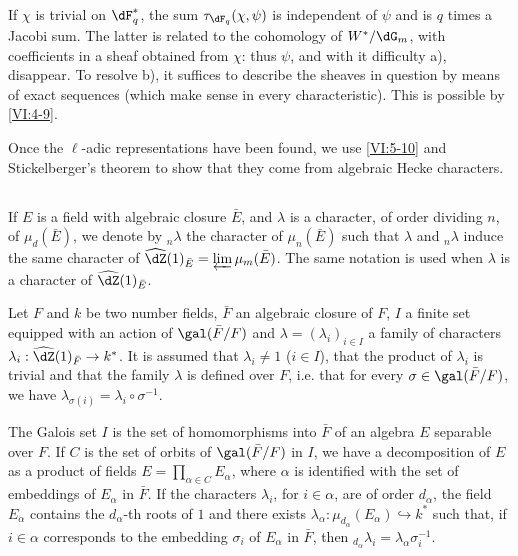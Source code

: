 If $\chi$ is trivial on $\dF_q^\ast$, the sum $\tau_{\dF_q}(\chi,\psi)$ 
is independent of $\psi$ and is $q$ times a Jacobi sum. The latter is 
related to the cohomology of $W^\ast/\dG_m$, with coefficients in a sheaf 
obtained from $\chi$: thus $\psi$, and with it difficulty a), disappear. To 
resolve b), it suffices to describe the sheaves in question by means of 
exact  sequences (which make sense in every characteristic). This is 
possible by \ref{VI:4-9}. 

Once the $\ell$-adic representations have been found, we use 
\ref{VI:5-10} and Stickelberger's theorem to show that they 
come from algebraic Hecke characters. 





\subsection{}\label{VI:6-1}

If $E$ is a field with algebraic closure $\bar E$, and $\lambda$ is 
a character, of order dividing $n$, of $\mu_d(\bar E)$, we denote by $_n\lambda$ the 
character of $\mu_n(\bar E)$ such that $\lambda$ and $_n \lambda$ induce the 
same character of $\widehat\dZ(1)_{\bar E} = \varprojlim \mu_m(\bar E)$. The 
same notation is used when $\lambda$ is a character of $\widehat\dZ(1)_{\bar E}$.

Let $F$ and $k$ be two number fields, $\bar F$ an algebraic closure of 
$F$, $I$ a finite set equipped with an action of $\gal(\bar F/F)$ and 
$\lambda=(\lambda_i)_{i\in I}$ a family of characters 
$\lambda_i:\widehat\dZ(1)_{\bar F} \to k^\ast$. It is assumed that 
$\lambda_i\ne 1$ ($i\in I$), that 
the product of $\lambda_i$ is trivial and that 
the family $\lambda$ is defined over $F$, i.e. that for every 
$\sigma\in \gal(\bar F/F)$, we have 
$\lambda_{\sigma(i)}=\lambda_i\circ \sigma^{-1}$. 

The Galois set $I$ is the set of homomorphisms into $\bar F$ of an 
algebra $E$ separable over $F$. If $C$ is the set of orbits of 
$\gal(\bar F/F)$ in $I$, we have a decomposition of $E$ as a product of fields 
$E=\prod_{\alpha\in C} E_\alpha$, where $\alpha$ is identified with the set of 
embeddings of $E_\alpha$ in $\bar F$. If the characters $\lambda_i$, for 
$i\in \alpha$, are of order $d_\alpha$, the field $E_\alpha$ contains the 
$d_\alpha$-th roots of $1$ and there exists 
$\lambda_\alpha:\mu_{d_\alpha}(E_\alpha) \hookrightarrow k^\ast$ such that, if 
$i\in \alpha$ corresponds to the embedding $\sigma_i$ of $E_\alpha$ in $\bar F$, 
then $_{d_\alpha} \lambda_i = \lambda_\alpha \sigma_i^{-1}$. 





